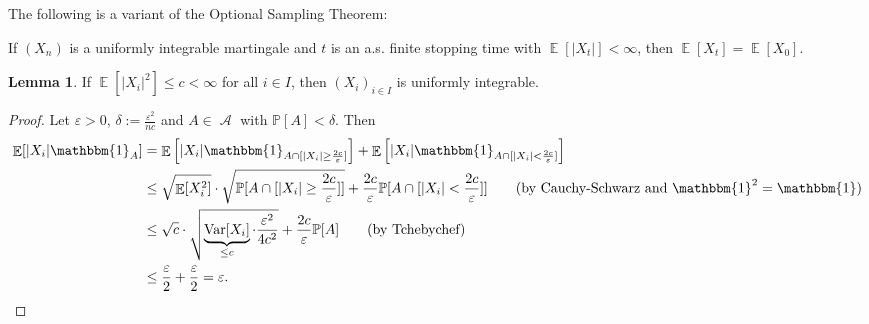 \documentclass[12pt,a4paper]{report}
\theoremstyle{definition}
\newtheorem{lemma}[theorem]{Lemma}
\theoremstyle{num.custom-title}
\DeclareMathOperator{\A}{\mathcal{A}}
\DeclareMathOperator{\E}{\mathbb{E}}
\DeclareMathOperator{\Var}{Var}
\renewcommand{\epsilon}{\varepsilon}
\renewcommand{\1}{\mathbbm{1}}
\renewcommand{\P}{\mathbb{P}}
\begin{document}
\noindent The following is a variant of the Optional Sampling Theorem:
\begin{center}
	If $(X_n)$ is a uniformly integrable martingale and $t$ is an a.s. finite stopping time with $\E[|X_t|]<\infty$, then $\E[X_t]=\E[X_0]$.
\end{center}

\begin{lemma}
	If $\E[|X_i|^2] \leq c < \infty$ for all $i \in I$, then $(X_i)_{i \in I}$ is uniformly integrable.
\begin{proof}
	Let $\epsilon>0$, $\delta := \frac{\epsilon^2}{nc}$ and $A \in \A$ with $\P[A]<\delta$. Then
	\begin{align*}
	\E[|X_i| \1_A]
	&= \E \left[ |X_i| \1_{A \cap [|X_i| \geq \frac{2c}{\epsilon}]} \right] + \E \left[ |X_i| \1_{A \cap [|X_i| < \frac{2c}{\epsilon}]} \right] \\
	&\leq \sqrt{\E[X_i^2]} \cdot \sqrt{\P[A \cap [|X_i| \geq \frac{2c}{\epsilon}]]} + \frac{2c}{\epsilon} \P[A \cap [|X_i| < \frac{2c}{\epsilon}]] \tag{by Cauchy-Schwarz and $\1^2=\1$} \\
	&\leq \sqrt{c} \cdot \sqrt{\underbrace{\Var[X_i]}_{\leq c} \cdot \frac{\epsilon^2}{4c^2}} + \frac{2c}{\epsilon} \P[A] \tag{by Tchebychef} \\
	&\leq \frac{\epsilon}{2} + \frac{\epsilon}{2} = \epsilon.
	\end{align*}
\end{proof}
\end{lemma}
\end{document}
